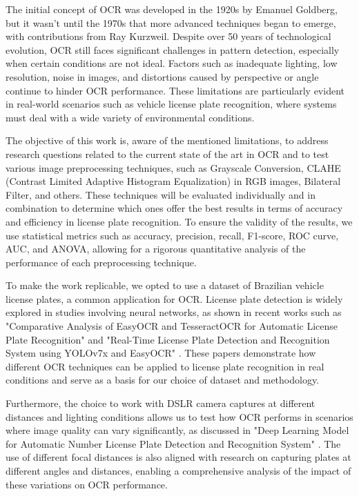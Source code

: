 \documentclass[conference]{IEEEtran}
\begin{document}
	The initial concept of OCR was developed in the 1920s by Emanuel Goldberg, but it wasn't until the 1970s that more advanced techniques began to emerge, with contributions from Ray Kurzweil. Despite over 50 years of technological evolution, OCR still faces significant challenges in pattern detection, especially when certain conditions are not ideal. Factors such as inadequate lighting, low resolution, noise in images, and distortions caused by perspective or angle continue to hinder OCR performance. These limitations are particularly evident in real-world scenarios such as vehicle license plate recognition, where systems must deal with a wide variety of environmental conditions.
	
	The objective of this work is, aware of the mentioned limitations, to address research questions related to the current state of the art in OCR and to test various image preprocessing techniques, such as Grayscale Conversion, CLAHE (Contrast Limited Adaptive Histogram Equalization) in RGB images, Bilateral Filter, and others. These techniques will be evaluated individually and in combination to determine which ones offer the best results in terms of accuracy and efficiency in license plate recognition. To ensure the validity of the results, we use statistical metrics such as accuracy, precision, recall, F1-score, ROC curve, AUC, and ANOVA, allowing for a rigorous quantitative analysis of the performance of each preprocessing technique.
	
	To make the work replicable, we opted to use a dataset of Brazilian vehicle license plates, a common application for OCR. License plate detection is widely explored in studies involving neural networks, as shown in recent works such as "Comparative Analysis of EasyOCR and TesseractOCR for Automatic License Plate Recognition" \cite{b1} and "Real-Time License Plate Detection and Recognition System using YOLOv7x and EasyOCR" \cite{b2}. These papers demonstrate how different OCR techniques can be applied to license plate recognition in real conditions and serve as a basis for our choice of dataset and methodology.
	
	Furthermore, the choice to work with DSLR camera captures at different distances and lighting conditions allows us to test how OCR performs in scenarios where image quality can vary significantly, as discussed in "Deep Learning Model for Automatic Number License Plate Detection and Recognition System" \cite{b3}. The use of different focal distances is also aligned with research on capturing plates at different angles and distances, enabling a comprehensive analysis of the impact of these variations on OCR performance.
	
\end{document}

